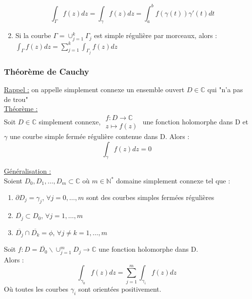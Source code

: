 \documentclass[../main.tex]{subfiles}
\begin{document}
\begin{enumerate}
    \begin{equation}
        \int_{\Gamma}f(z)dz = \int_{\gamma}f(z)dz = \int_a^bf(\gamma(t))\gamma'(t)dt
    \end{equation}
    \item Si la courbe $\Gamma = \cup_{j=1}^k\Gamma_j$ est simple régulière par morceaux, alors : $\int_{\Gamma}f(z)dz = \sum_{j=1}^k \int_{\Gamma_j}f(z)dz$\\
\end{enumerate}

\subsubsection{Théorème de Cauchy}
\color{gray} \underline{Rappel :} on appelle simplement connexe un ensemble ouvert $D\in \mathbb{C}$ qui "n'a pas de trou"\color{black}\\

\quad \underline{Théorème :}\\
Soit $D\in \mathbb{C}$ simplement connexe, $\begin{matrix} f:D\rightarrow \mathbb{C}\\ z\mapsto f(z)\end{matrix}$ une fonction holomorphe dans D et $\gamma$ une courbe simple fermée régulière contenue dans D. Alors :\\
\begin{equation}
    \int_\gamma f(z)dz = 0
\end{equation}

\quad \underline{Généralisation :}\\
Soient $D_0, D_1, \dots, D_m \subset \mathbb{C}$ où $m \in \mathbb{N}^*$ domaine simplement connexe tel que :\\
\begin{enumerate}
    \item $\partial D_j = \gamma_j$, $\forall j=0,\dots, m$ sont des courbes simples fermées régulières\\
    \item $\overline{D_j} \subset D_0$, $\forall j=1,\dots, m$\\
    \item $\overline{D_j} \cap \overline{D_k} = \phi$, $\forall j\neq k =1,\dots, m$\\
\end{enumerate}
Soit $f:D = \overline{D_0}\backslash \cup_{j=1}^m D_j \rightarrow \mathbb{C}$ une fonction holomorphe dans D.\\
Alors : \\
\begin{equation}
    \int_{\gamma_0}f(z)dz = \sum_{j=1}^m \int_{\gamma_i}f(z)dz
\end{equation}
Où toutes les courbes $\gamma_i$ sont orientées positivement.\\
\end{document}

